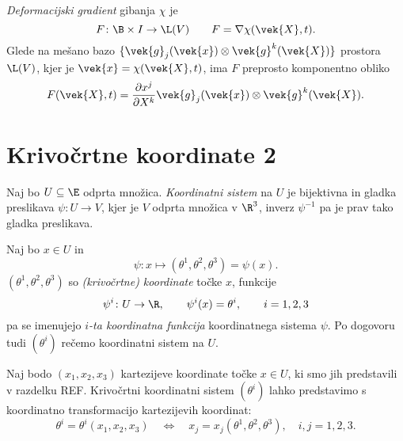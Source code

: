 \emph{Deformacijski gradient} gibanja $\chi$ je
\[ F\colon\B\times I\to \L(V) \qquad F=\nabla\chi(\vek{X},t). \]
Glede na mešano bazo $\{\vek{g}_j(\vek{x})\otimes\vek{g}^k(\vek{X})\}$ prostora $\L(V)$,
kjer je $\vek{x}=\chi(\vek{X},t)$, ima $F$ preprosto komponentno obliko
\[ F(\vek{X},t) = \frac{\partial x^j}{\partial X^k}\vek{g}_j(\vek{x})\otimes\vek{g}^k(\vek{X}). \]



\section{Krivočrtne koordinate 2}


\begin{definicija}
	Naj bo $U\subseteq\E$ odprta množica. \emph{Koordinatni sistem} na $U$ je bijektivna in
	gladka preslikava $\psi\colon U\to V$, kjer je $V$ odprta
	množica v $\R^3$, inverz $\psi^{-1}$ pa je prav tako gladka preslikava.
\end{definicija}

Naj bo $x\in U$ in
\[ \psi\colon x\mapsto (\theta^1,\theta^2,\theta^3)=\psi(x). \]
$(\theta^1,\theta^2,\theta^3)$ so \emph{(krivočrtne) koordinate} točke $x$, funkcije
\[ \psi^i\colon U\to\R,\qquad \psi^i(x)=\theta^i,\qquad i=1,2,3 \]
pa se imenujejo \emph{$i$-ta koordinatna funkcija} koordinatnega sistema $\psi$.
Po dogovoru tudi $(\theta^i)$ rečemo koordinatni sistem na $U$.

Naj bodo $(x_1,x_2,x_3)$ kartezijeve koordinate točke $x\in U$, ki smo jih predstavili
v razdelku REF. Krivočrtni koordinatni sistem $(\theta^i)$ lahko predstavimo s koordinatno transformacijo
kartezijevih koordinat:
\begin{equation}\label{e:kt}
	\theta^i = \theta^i(x_1,x_2,x_3) \quad \Leftrightarrow \quad x_j=x_j(\theta^1,\theta^2,\theta^3), \quad i,j=1,2,3.
\end{equation}

